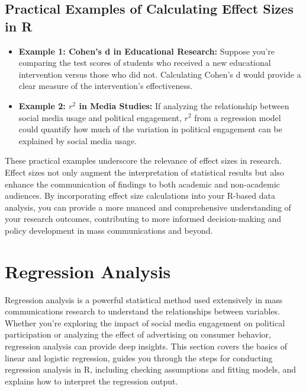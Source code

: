 \documentclass[
]{book}
\begin{document}
\subsection*{Practical Examples of Calculating Effect Sizes in R}\label{practical-examples-of-calculating-effect-sizes-in-r}

\begin{itemize}
\item
  \textbf{Example 1: Cohen's d in Educational Research:} Suppose you're comparing the test scores of students who received a new educational intervention versus those who did not. Calculating Cohen's d would provide a clear measure of the intervention's effectiveness.
\item
  \textbf{Example 2: \(r^2\) in Media Studies:} If analyzing the relationship between social media usage and political engagement, \(r^2\) from a regression model could quantify how much of the variation in political engagement can be explained by social media usage.
\end{itemize}

These practical examples underscore the relevance of effect sizes in research. Effect sizes not only augment the interpretation of statistical results but also enhance the communication of findings to both academic and non-academic audiences. By incorporating effect size calculations into your R-based data analysis, you can provide a more nuanced and comprehensive understanding of your research outcomes, contributing to more informed decision-making and policy development in mass communications and beyond.

\section{Regression Analysis}\label{regression-analysis-1}

Regression analysis is a powerful statistical method used extensively in mass communications research to understand the relationships between variables. Whether you're exploring the impact of social media engagement on political participation or analyzing the effect of advertising on consumer behavior, regression analysis can provide deep insights. This section covers the basics of linear and logistic regression, guides you through the steps for conducting regression analysis in R, including checking assumptions and fitting models, and explains how to interpret the regression output.
\end{document}
